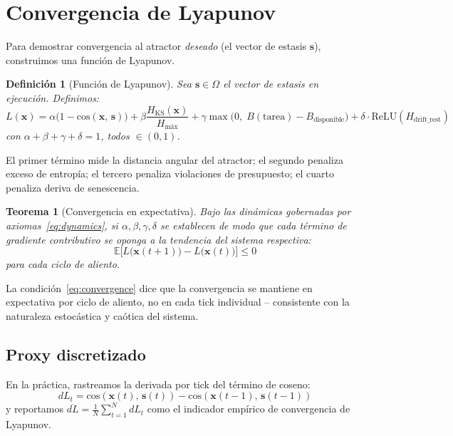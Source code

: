 \documentclass[11pt, a4paper]{article}
\newtheorem{theorem}{Teorema}
\newtheorem{definition}{Definición}
\newcommand{\E}{\mathbb{E}}
\newcommand{\stasis}{\bm{s}}
\newcommand{\sv}{\bm{x}}
\newcommand{\cosim}[2]{\mathrm{cos}\!\left(#1,\, #2\right)}
\begin{document}
\section{Convergencia de Lyapunov}
\label{sec:lyapunov}

Para demostrar convergencia al atractor \emph{deseado} (el vector de estasis
$\stasis$), construimos una función de Lyapunov.

\begin{definition}[Función de Lyapunov]
\label{def:lyapunov}
Sea $\stasis \in \Omega$ el vector de estasis en ejecución.
Definimos:
\begin{equation}
  L(\sv) = \alpha \bigl(1 - \cosim{\sv}{\stasis}\bigr)
          + \beta \frac{H_\text{KS}(\sv)}{H_\text{máx}}
          + \gamma \max\!\bigl(0,\; B(\text{tarea}) - B_\text{disponible}\bigr)
          + \delta \cdot \mathrm{ReLU}(H_\text{drift\_rest})
\label{eq:lyapunov}
\end{equation}
con $\alpha + \beta + \gamma + \delta = 1$, todos $\in (0,1)$.
\end{definition}

El primer término mide la distancia angular del atractor;
el segundo penaliza exceso de entropía; el tercero penaliza violaciones de presupuesto;
el cuarto penaliza deriva de senescencia.

\begin{theorem}[Convergencia en expectativa]
\label{thm:convergence}
Bajo las dinámicas gobernadas por axiomas~\eqref{eq:dynamics},
si $\alpha, \beta, \gamma, \delta$ se establecen de modo que cada término
de gradiente contributivo se oponga a la tendencia del sistema respectiva:
\begin{equation}
  \E\bigl[L\bigl(\sv(t+1)\bigr) - L\bigl(\sv(t)\bigr)\bigr] \le 0
\label{eq:convergence}
\end{equation}
para cada ciclo de aliento.
\end{theorem}

La condición~\eqref{eq:convergence} dice que la convergencia se mantiene en expectativa por
ciclo de aliento, no en cada tick individual -- consistente con la naturaleza
estocástica y caótica del sistema.

\subsection*{Proxy discretizado}

En la práctica, rastreamos la derivada por tick del término de coseno:
\begin{equation}
  dL_t = \cosim{\sv(t)}{\stasis(t)} - \cosim{\sv(t-1)}{\stasis(t-1)}
\end{equation}
y reportamos $\overline{dL} = \frac{1}{N}\sum_{t=1}^{N} dL_t$
como el indicador empírico de convergencia de Lyapunov.
\end{document}
